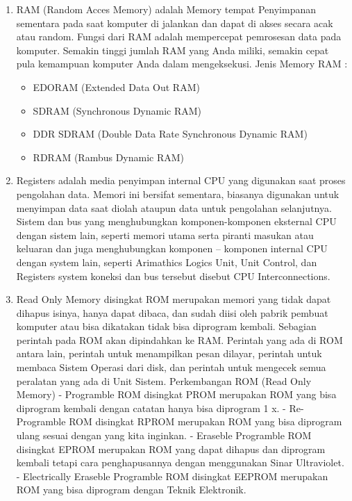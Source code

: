 \documentclass{article}
\begin{document}
\begin{enumerate}

\item RAM (Random Acces Memory) adalah Memory tempat Penyimpanan sementara pada saat komputer di jalankan dan dapat di akses secara acak atau random. Fungsi dari RAM adalah mempercepat pemrosesan data pada komputer. Semakin tinggi jumlah RAM yang Anda miliki, semakin cepat pula kemampuan komputer Anda dalam mengeksekusi.
Jenis Memory RAM :

\begin{itemize}

\item EDORAM (Extended Data Out RAM)  
\item SDRAM (Synchronous Dynamic RAM)  
\item DDR SDRAM (Double Data Rate Synchronous Dynamic RAM) 
\item RDRAM (Rambus Dynamic RAM)

\end{itemize}

\item Registers adalah media penyimpan internal CPU yang digunakan saat proses pengolahan data. Memori ini bersifat sementara, biasanya digunakan untuk menyimpan data saat diolah ataupun data untuk pengolahan selanjutnya. Sistem dan bus yang menghubungkan komponen-komponen eksternal CPU dengan sistem lain, seperti memori utama serta piranti masukan atau keluaran dan juga menghubungkan komponen – komponen internal CPU dengan system lain, seperti Arimathics Logics Unit, Unit Control, dan Registers system koneksi dan bus tersebut disebut CPU Interconnections. \cite{junior2016evolusi}

\item Read Only Memory disingkat ROM merupakan memori yang tidak dapat dihapus isinya, hanya dapat dibaca, dan sudah diisi oleh pabrik pembuat komputer atau bisa dikatakan tidak bisa diprogram kembali. Sebagian perintah pada ROM akan dipindahkan ke RAM. Perintah yang ada di ROM antara lain, perintah untuk menampilkan pesan dilayar, perintah untuk membaca Sistem Operasi dari disk, dan perintah untuk mengecek semua peralatan yang ada di Unit Sistem.
Perkembangan ROM (Read Only Memory)
-  Programble ROM disingkat PROM merupakan ROM yang bisa diprogram kembali dengan catatan hanya bisa diprogram 1 x.
- Re-Programble ROM disingkat RPROM merupakan ROM yang bisa diprogram ulang sesuai dengan yang kita inginkan.
- Eraseble Programble ROM disingkat EPROM merupakan ROM yang dapat dihapus dan diprogram kembali tetapi cara penghapusannya dengan menggunakan Sinar Ultraviolet.
- Electrically Eraseble Programble ROM disingkat EEPROM merupakan ROM yang bisa diprogram dengan Teknik Elektronik. \cite{junior2016evolusi}


\end{enumerate}
\end{document}
